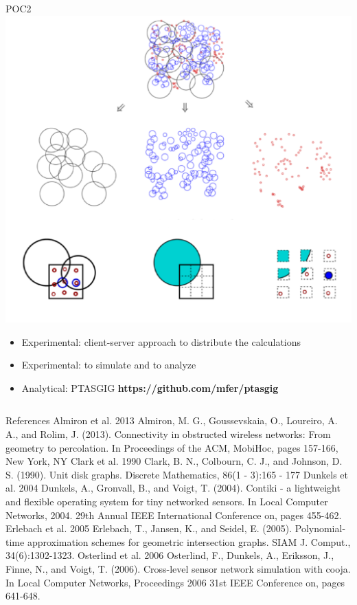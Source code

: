 \documentclass[final,hyperref={pdfpagelabels=false}]{beamer}
\begin{document}
\begin{frame}{}
\begin{columns}[t]
\begin{column}{.48\linewidth}
\begin{block}{POC2}
          \includegraphics[width=0.47\linewidth]{ptasgig}
          \begin{itemize}
          \item Experimental: client-server approach to distribute the calculations
          \item Experimental: to simulate and to analyze
          \item Analytical: PTASGIG {\bf https://github.com/mfer/ptasgig}
          \end{itemize}
        \end{block}
      \end{column}
    \end{columns}
    \begin{block}{\footnotesize References}
      \scriptsize
      {\normalsize Almiron et al. 2013} Almiron, M. G., Goussevskaia, O., Loureiro, A. A.,
        and Rolim, J. (2013). Connectivity in obstructed wireless networks: From geometry to
        percolation. In Proceedings of the ACM, MobiHoc, pages 157-166, New York, NY \newline
      {\normalsize Clark et al. 1990} Clark, B. N., Colbourn, C. J., and Johnson, D. S. (1990).
        Unit disk graphs. Discrete Mathematics, 86(1 - 3):165 - 177\newline
      {\normalsize Dunkels et al. 2004} Dunkels, A., Gronvall, B., and Voigt, T. (2004).
        Contiki - a lightweight and flexible operating system for tiny networked sensors.
        In Local Computer Networks, 2004. 29th Annual IEEE International Conference on,
        pages 455-462.\newline
      {\normalsize Erlebach et al. 2005} Erlebach, T., Jansen, K., and Seidel, E. (2005).
        Polynomial-time approximation schemes for geometric intersection graphs. SIAM J.
        Comput., 34(6):1302-1323. \newline
      {\normalsize Osterlind et al. 2006}  Osterlind, F., Dunkels, A., Eriksson, J., Finne,
        N., and Voigt, T. (2006). Cross-level sensor network simulation with cooja. In Local
        Computer Networks, Proceedings 2006 31st IEEE Conference on, pages 641-648.
    \end{block}
  \end{frame}
\end{document}
